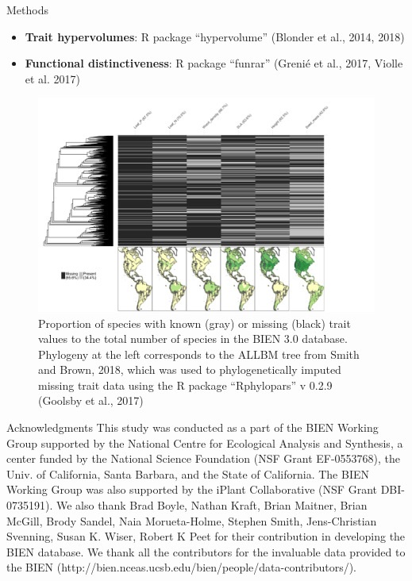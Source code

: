 \documentclass[final]{beamer}
\newlength{\onecolwid}
\begin{document}
\begin{frame}[t]
\begin{columns}[t]
\begin{column}{\onecolwid}
\begin{block}{Methods}
\begin{itemize}
	\item \textbf{Trait hypervolumes}: R package ``hypervolume'' (Blonder et al., 2014, 2018)
	\item \textbf{Functional distinctiveness}:  R package ``funrar''  (Greni\'e et al., 2017, Violle et al. 2017)
\end{itemize}
	\end{block}



\begin{figure}[h]
	\centering
	\includegraphics[width=\textwidth]{./figures/Trait_sampling}
	\caption{ \footnotesize Proportion of species with known (gray) or missing (black) trait values to the total number of species in the BIEN 3.0 database. Phylogeny at the left corresponds to the ALLBM tree from Smith and Brown, 2018, which was used to phylogenetically imputed missing trait data using the R package ``Rphylopars'' v 0.2.9 (Goolsby et al., 2017)}
	\label{fig:sampling}
\end{figure}

	
	
\begin{block}{Acknowledgments}
\tiny This study was conducted as a part of the BIEN Working Group supported by the National Centre for Ecological Analysis and Synthesis, a center funded by the National Science Foundation (NSF Grant EF-0553768), the Univ. of California, Santa Barbara, and the State of California. The BIEN Working Group was also supported by the iPlant Collaborative (NSF Grant DBI- 0735191). We also thank Brad Boyle, Nathan Kraft, Brian Maitner, Brian McGill, Brody Sandel, Naia Morueta-Holme, Stephen Smith, Jens-Christian Svenning, Susan K. Wiser, Robert K Peet for their contribution in developing the BIEN database. We thank all the contributors for the invaluable data provided to the BIEN (http://bien.nceas.ucsb.edu/bien/people/data-contributors/). 
\end{block}



\end{column}
\end{columns}
\end{frame}
\end{document}
